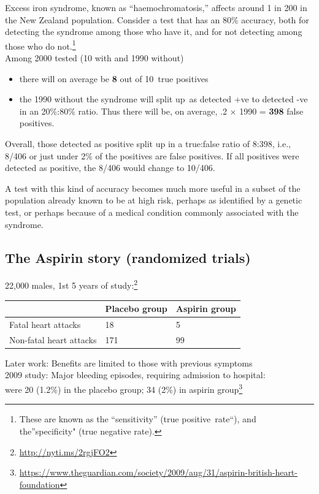 \documentclass[
  10pt,
  b5paper]{book}
\providecommand{\tightlist}{%
  \setlength{\itemsep}{0pt}\setlength{\parskip}{0pt}}
\begin{document}
Excess iron syndrome, known as ``haemochromatosis,'' affects
around 1 in 200 in the New Zealand population. Consider a
test that has an 80\% accuracy, both for detecting the syndrome
among those who have it, and for not detecting among those
who do not.\footnote{These are known as the ``sensitivity'' (true
  positive~rate``), and the''specificity" (true negative rate).}\\
Among 2000 tested (10 with and 1990 without)

\begin{itemize}
\tightlist
\item
  there will on average be \textbf{8} out of 10~true positives
\item
  the 1990 without the syndrome will split up~as
  detected +ve to detected -ve in an 20\%:80\% ratio. Thus
  there will be, on average, .2 \(\times\) 1990 = \textbf{398}
  false positives.
\end{itemize}

Overall, those detected as positive split up in a true:false
ratio of 8:398, i.e., 8/406 or just under 2\% of the positives
are false positives. If all positives were detected as
positive, the 8/406 would change to 10/406.

A test with this kind of accuracy becomes much more useful
in a subset of the population already known to be at high
risk, perhaps as identified by a genetic test, or perhaps
because of a medical condition commonly associated with
the syndrome.

\hypertarget{the-aspirin-story-randomized-trials}{%
\subsection*{The Aspirin story (randomized trials)}\label{the-aspirin-story-randomized-trials}}

22,000 males, 1st 5 years of study:\footnote{\url{http://nyti.ms/2rgjFO2}}

\begin{longtable}[]{@{}lll@{}}
\toprule
& Placebo group & Aspirin group \\
\midrule
\endhead
Fatal heart attacks & 18 & 5 \\
Non-fatal heart attacks & 171 & 99 \\
\bottomrule
\end{longtable}

Later work: Benefits are limited to those with previous symptoms\\
2009 study: Major bleeding episodes, requiring admission to hospital:\\
were 20 (1.2\%) in the placebo group; 34 (2\%) in aspirin group\footnote{\url{https://www.theguardian.com/society/2009/aug/31/aspirin-british-heart-foundation}}
\end{document}
